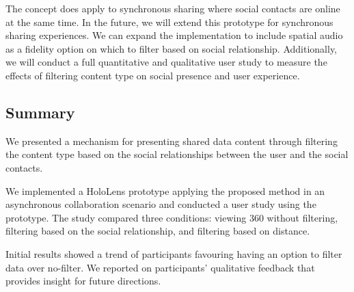 The concept does apply to synchronous sharing where social contacts are online at the same time. In the future, we will extend this prototype for synchronous sharing experiences. We can expand the implementation to include spatial audio as a fidelity option on which to filter based on social relationship. 
Additionally, we will conduct a full quantitative and qualitative user study to measure the effects of filtering content type on social presence and user experience. 

\subsection{Summary}

We presented a mechanism for presenting shared data content through filtering the content type based on the social relationships between the user and the social contacts. 

We implemented a HoloLens prototype applying the proposed method in an asynchronous collaboration scenario and conducted a user study using the prototype. The study compared three conditions: viewing 360 without filtering, filtering based on the social relationship, and filtering based on distance. 

Initial results showed a trend of participants favouring having an option to filter data over no-filter. We reported on participants' qualitative feedback that provides insight for future directions. 
